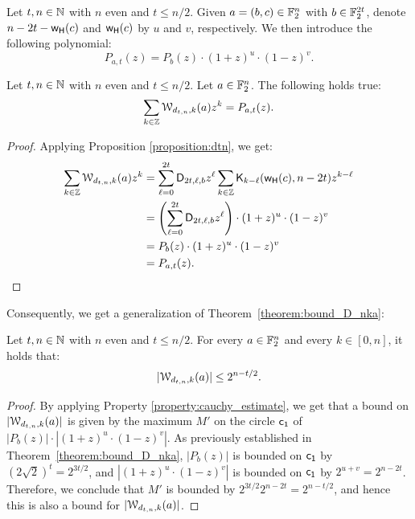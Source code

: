 \documentclass[11pt]{llncs}
\begin{document}
\begin{definition}\label{defi:P_a_t}
    Let $t, n\in \mathbb{N}$ with $n$ even and $t\le n/2$. Given $a=(b,c)\in\mathbb{F}_2^n$ with $b\in\mathbb{F}_2^{2t}$, denote $n-2t-\mathsf{w_H}(c)$ and $\mathsf{w_H}(c)$ by $u$ and $v$, respectively. We  then introduce the following polynomial:
    \[
        P_{a,t}(z)=P_b(z)\cdot(1+z)^u\cdot(1-z)^v.
    \]
\end{definition}

\begin{proposition}
    Let $t, n\in \mathbb{N}$ with $n$ even and $t\le n/2$. Let $a\in\mathbb{F}_2^n$. The following holds true: 
    \[
        \sum_{k\in\mathbb{Z}}\mathcal{W}_{d_{t,n},k}(a)z^k=P_{a,t}(z).
    \]
\end{proposition}

\begin{proof}
    Applying Proposition \ref{proposition:dtn}, we get:
    \begin{align*}
        \sum_{k\in\mathbb{Z}}\mathcal{W}_{d_{t,n},k}(a)z^k&=\sum_{\ell=0}^{2t}\mathsf{D}_{2t,\ell,b}z^\ell\sum_{k\in\mathbb{Z}}\mathsf{K}_{k-\ell}(\mathsf{w_H}(c),n-2t)z^{k-\ell}\\
        &=\left(\sum_{\ell=0}^{2t}\mathsf{D}_{2t,\ell,b}z^\ell\right)\cdot(1+z)^u\cdot(1-z)^v\\
        &=P_b(z)\cdot(1+z)^u\cdot(1-z)^v\\
        &=P_{a,t}(z).\qedhere
    \end{align*}
\end{proof}

Consequently, we get a generalization of Theorem~\ref{theorem:bound_D_nka}:

\begin{theorem}\label{theorem:bound_D_nka_generalized}
    Let $t, n\in \mathbb{N}$ with $n$ even and $t\le n/2$. For every $a\in\mathbb{F}_2^n$ and every $k\in[0,n]$, it holds that:
    \[
        |\mathcal{W}_{d_{t,n},k}(a)|\leq 2^{n-t/2}.
    \]
\end{theorem}

\begin{proof}
    By applying Property \ref{property:cauchy_estimate}, we get that a bound on $|\mathcal{W}_{d_{t,n},k}(a)|$ is given by the maximum $M'$ on the circle $\mathsf{c_1}$ of $|P_b(z)|\cdot|(1+z)^u\cdot(1-z)^v|$. 
    As previously established in Theorem~\ref{theorem:bound_D_nka}, $|P_b(z)|$ is bounded on $\mathsf{c_1}$ by $(2\sqrt 2)^t=2^{3t/2}$, and $|(1+z)^u\cdot(1-z)^v|$ is bounded on $\mathsf{c_1}$ by $2^{u+v}=2^{n-2t}$. 
    Therefore, we conclude that $M'$ is bounded by $2^{3t/2}2^{n-2t}=2^{n-t/2}$, and hence this is also a bound for $|\mathcal{W}_{d_{t,n},k}(a)|$. 
\end{proof}
\end{document}
